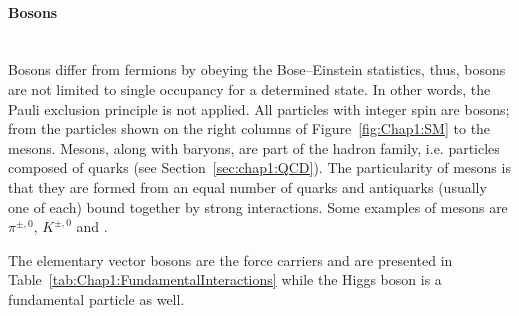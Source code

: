 \paragraph{Bosons}\mbox{}\\
Bosons differ from fermions by obeying the Bose--Einstein statistics, thus, bosons are 
not limited to single occupancy for a determined state. In other words, the Pauli exclusion 
principle is not applied. All particles with integer spin are bosons; from the particles shown on the right columns of Figure~\ref{fig:Chap1:SM}
to the mesons. Mesons, along with baryons, are part of the hadron family, i.e. particles composed of quarks (see Section~\ref{sec:chap1:QCD}). 
The particularity of mesons is that they are formed from an equal number of quarks and antiquarks (usually one of each) bound together by strong 
interactions.  Some examples of mesons are $\pi^{\pm , 0}$, $K^{\pm , 0}$ and \PJpsi. %


The elementary vector bosons are the force carriers and are presented in Table~\ref{tab:Chap1:FundamentalInteractions} while the Higgs boson is a fundamental particle as well. 




